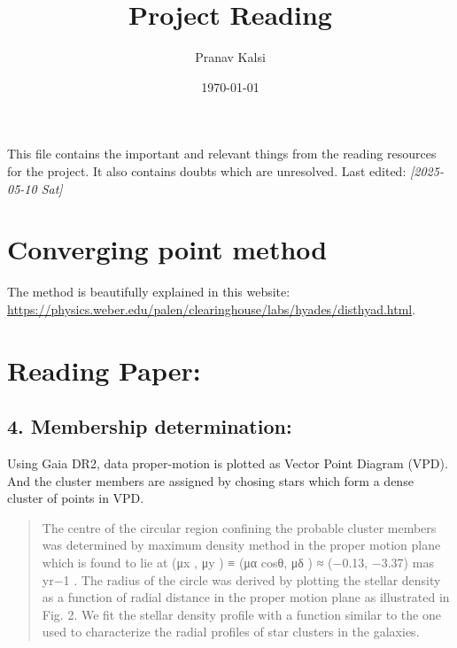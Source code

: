 \documentclass[11pt]{article}
\author{Pranav Kalsi}
\date{\today}
\title{Project Reading}
\begin{document}
\maketitle
\tableofcontents

This file contains the important and relevant things from the reading resources for the project. It also contains doubts which are unresolved.
Last edited: \textit{[2025-05-10 Sat] } 
\section{Converging point method}
\label{sec:orged6e051}
The method is beautifully explained in this website: \url{https://physics.weber.edu/palen/clearinghouse/labs/hyades/disthyad.html}.

\section{Reading Paper:}
\label{sec:org08af745}

\subsection{4. Membership determination:}
\label{sec:org21eb5b5}
Using Gaia DR2, data proper-motion is plotted as Vector Point Diagram (VPD). And the cluster members are assigned by chosing   stars which form a dense cluster of points in VPD.
\begin{quote}
    The centre of the circular region confining the
probable cluster members was determined by maximum density
method in the proper motion plane which is found to lie at (μx , μy )
≡ (μα cosθ, μδ ) ≈ (−0.13, −3.37) mas yr−1 .
The radius of the circle
was derived by plotting the stellar density as a function of radial
distance in the proper motion plane as illustrated in Fig. 2. We fit the stellar density profile with a function similar to the one used to characterize the radial profiles of star clusters in the galaxies.
\end{quote}
\end{document}
